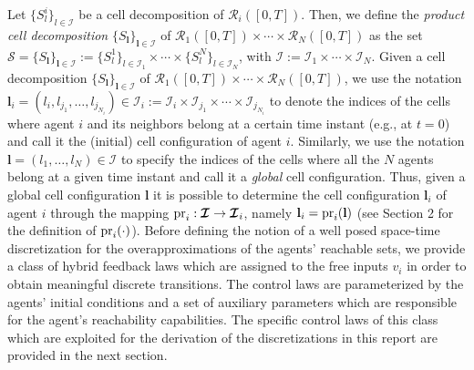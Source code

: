 \documentclass[reqno]{amsart}
\theoremstyle{plain}
\theoremstyle{definition}
\numberwithin{equation}{section}
\begin{document}
\noindent  Let $\{S_l^i\}_{l\in{\ensuremath{\boldsymbol{\mathcal{I}}}}}$ be a cell decomposition of  ${\ensuremath{\mathcal{R}}}_i([0,T])$. Then, we define the \textit{product cell decomposition} $\{S_{{\textbf{{l}}}}\}_{{\textbf{{l}}}\in{\ensuremath{\boldsymbol{\mathcal{I}}}}}$ of ${\ensuremath{\mathcal{R}}}_1([0,T])\times\cdots\times{\ensuremath{\mathcal{R}}}_N([0,T])$ as the set ${\ensuremath{\mathcal{S}}}=\{S_{{\textbf{{l}}}}\}_{{\textbf{{l}}}\in{\ensuremath{\boldsymbol{\mathcal{I}}}}}:=\{S_l^1\}_{l\in{\ensuremath{\mathcal{I}}}_1}\times\cdots\times\{S_l^N\}_{l\in{\ensuremath{\mathcal{I}}}_N}$, with ${\ensuremath{\boldsymbol{\mathcal{I}}}}:={\ensuremath{\mathcal{I}}}_1\times\cdots\times{\ensuremath{\mathcal{I}}}_N$. Given a cell decomposition $\{S_{{\textbf{{l}}}}\}_{{\textbf{{l}}}\in{\ensuremath{\boldsymbol{\mathcal{I}}}}}$ of ${\ensuremath{\mathcal{R}}}_1([0,T])\times\cdots\times{\ensuremath{\mathcal{R}}}_N([0,T])$, we use the notation ${\textbf{{l}}}_i=(l_i,l_{j_1},\ldots,l_{j_{N_i}})\in{\ensuremath{\boldsymbol{\mathcal{I}}}}_i:={\ensuremath{\mathcal{I}}}_i\times{\ensuremath{\mathcal{I}}}_{j_1}\times\cdots\times{\ensuremath{\mathcal{I}}}_{j_{N_i}}$ to denote the indices of the cells where agent $i$ and its neighbors belong at a certain time instant (e.g., at $t=0$) and call it the (initial) cell configuration of agent $i$. Similarly, we use the notation ${\textbf{{l}}}=(l_1,\ldots,l_N)\in{\ensuremath{\boldsymbol{\mathcal{I}}}}$ to specify the indices of the cells where all the $N$ agents belong at a given time instant and call it a \textit{global} cell configuration. Thus, given a global cell configuration ${\textbf{{l}}}$ it is possible to determine the cell configuration ${\textbf{{l}}}_i$ of agent $i$ through the mapping ${\rm pr}_i:{\ensuremath{\boldsymbol{\mathcal{I}}}}\to{\ensuremath{\boldsymbol{\mathcal{I}}}}_i$, namely ${\textbf{{l}}}_i={\rm pr}_i({\textbf{{l}}})$ (see Section 2 for the definition of ${\rm pr}_i(\cdot)$). Before defining the notion of a well posed space-time discretization for the overapproximations of the agents' reachable sets, we provide a class of hybrid feedback laws which are assigned to the free inputs $v_i$ in order to obtain meaningful discrete transitions. The control laws are parameterized by the agents' initial conditions and a set of auxiliary parameters which are responsible for the agent's reachability capabilities. The specific control laws of this class which are exploited for the derivation of the discretizations in this report are provided in the next section. 
\end{document}
